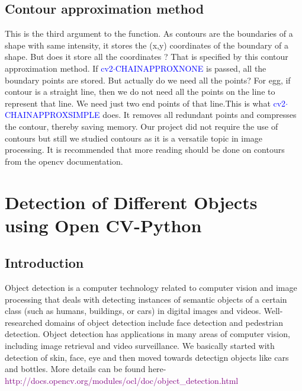 \documentclass[a4paper,12pt]{article}
\begin{document}
\subsection{Contour approximation method}
This is the third argument to the function. As contours are the boundaries of a shape with same intensity, 
it stores the (x,y) coordinates of the boundary of a shape. But does it store all the coordinates ? That is specified by this contour 
approximation method.
\vspace{0.5cm}
\newline If \textcolor{blue}{cv2$\cdot$CHAIN\textunderscore APPROX\textunderscore NONE} is passed, all the boundary points are stored. But actually do we need all the points? For egg, 
if contour is a straight line, then we do not need all the points on the line to represent that line. We need just two end points 
of that line.This is what \textcolor{blue}{cv2$\cdot$CHAIN\textunderscore APPROX\textunderscore SIMPLE} does. It removes all redundant points and compresses the contour, thereby saving memory.
\vspace{0.5cm}
\newline
Our project did not require the use of contours but still we studied contours as it is a versatile topic in image processing. It
is recommended that more reading should be done on contours from the opencv documentation.

\newpage
\section{Detection of Different Objects using Open CV-Python}

\subsection{Introduction}
Object detection is a computer technology related to computer vision and image
processing that deals with detecting instances of semantic objects of a certain
class (such as humans, buildings, or cars) in digital images and videos.
Well-researched domains of object detection include face detection and pedestrian
detection. Object detection has applications in many areas of computer vision,
including image retrieval and video surveillance. We basically started with
detection of skin, face, eye and then moved towards detectign objects like cars and bottles.
More details can be found here-
\newline \textcolor{purple}{http://docs.opencv.org/modules/ocl/doc/object\_detection.html}
\end{document}
